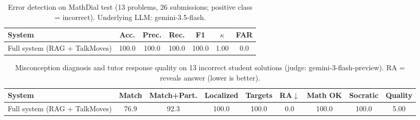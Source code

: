 \begin{table}[t]\centering\small
\caption{Error detection on MathDial test (13 problems, 26 submissions; positive class = incorrect). Underlying LLM: gemini-3.5-flash.}
\begin{tabular}{lcccccc}\toprule
System & Acc. & Prec. & Rec. & F1 & $\kappa$ & FAR \\\midrule
Full system (RAG + TalkMoves) & 100.0 & 100.0 & 100.0 & 100.0 & 1.00 & 0.0 \\
\bottomrule\end{tabular}\end{table}

\begin{table}[t]\centering\small
\caption{Misconception diagnosis and tutor response quality on 13 incorrect student solutions (judge: gemini-3-flash-preview). RA = reveals answer (lower is better).}
\begin{tabular}{lcccccccc}\toprule
System & Match & Match+Part. & Localized & Targets & RA$\downarrow$ & Math OK & Socratic & Quality \\\midrule
Full system (RAG + TalkMoves) & 76.9 & 92.3 & 100.0 & 100.0 & 0.0 & 100.0 & 100.0 & 5.00 \\
\bottomrule\end{tabular}\end{table}
